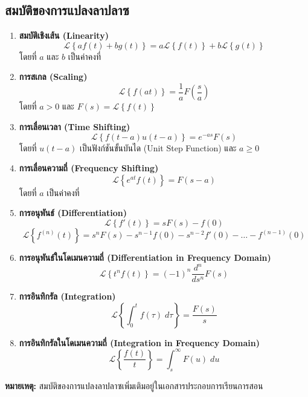 \documentclass{article}
\newcommand{\laplace}[1]{\mathcal{L}\left\{#1\right\}}
\begin{document}
\subsection{สมบัติของการแปลงลาปลาซ}
\begin{tcolorbox}
    \noindent
    \begin{enumerate}[label=\arabic*.]
        \item \textbf{สมบัติเชิงเส้น (Linearity)}
        \begin{equation*}
            \laplace{af(t) + bg(t)} = a \laplace{f(t)} + b \laplace{g(t)}
        \end{equation*}
        โดยที่ $a$ และ $b$ เป็นค่าคงที่ 
        \item \textbf{การสเกล (Scaling)}
        \begin{equation*}
            \laplace{f(at)} = \frac{1}{a} F\left(\frac{s}{a}\right)
        \end{equation*}
        โดยที่ $a > 0$ และ $F(s) = \laplace{f(t)}$
        \item \textbf{การเลื่อนเวลา (Time Shifting)}
        \begin{equation*}
            \laplace{f(t - a) u(t - a)} = e^{-as} F(s)
        \end{equation*}
        โดยที่ $u(t - a)$ เป็นฟังก์ชันขั้นบันได (Unit Step Function) และ $a \geq 0$
        \item \textbf{การเลื่อนความถี่ (Frequency Shifting)}
        \begin{equation*}
            \laplace{e^{at} f(t)} = F(s - a)
        \end{equation*}
        โดยที่ $a$ เป็นค่าคงที่
        \item \textbf{การอนุพันธ์ (Differentiation)}
        \begin{equation*}
            \laplace{f'(t)} = s F(s) - f(0)
        \end{equation*}
        \begin{equation*}
            \laplace{f^{(n)}(t)} = s^n F(s) - s^{n-1} f(0) - s^{n-2} f'(0) - \ldots - f^{(n-1)}(0)
        \end{equation*}
        \item \textbf{การอนุพันธ์ในโดเมนความถี่ (Differentiation in Frequency Domain)}
        \begin{equation*}
            \laplace{t^n f(t)} = (-1)^n \frac{d^n}{ds^n} F(s)
        \end{equation*}
        \item \textbf{การอินทิกรัล (Integration)}
        \begin{equation*}
            \laplace{\int_0^t f(\tau) \; d\tau} = \frac{F(s)}{s}
        \end{equation*}
        \item \textbf{การอินทิกรัลในโดเมนความถี่ (Integration in Frequency Domain)}
        \begin{equation*}
            \laplace{\frac{f(t)}{t}} = \int_s^\infty F(u) \; du
        \end{equation*}
    \end{enumerate}
    \textbf{หมายเหตุ:} สมบัติของการแปลงลาปลาซเพิ่มเติมอยู่ในเอกสารประกอบการเรียนการสอน
\end{tcolorbox}
\end{document}
